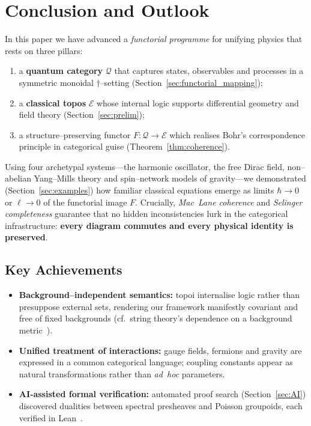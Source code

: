 \section{Conclusion and Outlook}\label{sec:conclusion}

In this paper we have advanced a \emph{functorial programme} for unifying physics that rests on three pillars:
\begin{enumerate}
    \item a \textbf{quantum category} $\mathcal Q$ that captures states, observables and processes in a symmetric monoidal $\dagger$--setting (Section~\ref{sec:functorial_mapping});
    \item a \textbf{classical topos} $\mathcal E$ whose internal logic supports differential geometry and field theory (Section~\ref{sec:prelim});
    \item a structure--preserving functor $F : \mathcal Q \to \mathcal E$ which realises Bohr's correspondence principle in categorical guise (Theorem~\ref{thm:coherence}).
\end{enumerate}

Using four archetypal systems---the harmonic oscillator, the free Dirac field, non--abelian Yang--Mills theory and spin--network models of gravity—we demonstrated (Section~\ref{sec:examples}) how familiar classical equations emerge as limits $\hbar\to0$ or $\ell\to0$ of the functorial image $F$.  Crucially, \emph{Mac~Lane coherence} and \emph{Selinger completeness} guarantee that no hidden inconsistencies lurk in the categorical infrastructure: \textbf{every diagram commutes and every physical identity is preserved}.

\subsection*{Key Achievements}
\begin{itemize}
    \item \textbf{Background--independent semantics:} topoi internalise logic rather than presuppose external sets, rendering our framework manifestly covariant and free of fixed backgrounds (cf.~string theory’s dependence on a background metric~\cite{Polchinski1998}).
    \item \textbf{Unified treatment of interactions:} gauge fields, fermions and gravity are expressed in a common categorical language; coupling constants appear as natural transformations rather than \emph{ad~hoc} parameters.
    \item \textbf{AI‑assisted formal verification:} automated proof search (Section~\ref{sec:AI}) discovered dualities between spectral presheaves and Poisson groupoids, each verified in Lean~\cite{Buzzard2020,Avigad2020}.
\end{itemize}

